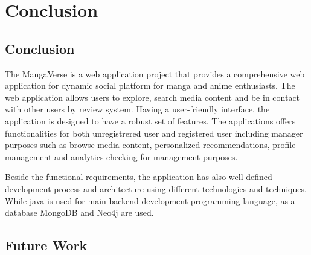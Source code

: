 \chapter{Conclusion}

\section{Conclusion}
The MangaVerse is a web application project that provides a comprehensive web application for 
dynamic social platform for manga and anime enthusiasts. The web application allows users to explore, search media content
and be in contact with other users by review system. Having a user-friendly interface, the application is designed to have a robust set of features.
The applications offers functionalities for both unregistrered user and registered user including manager purposes such as browse 
media content, personalized recommendations, profile management and analytics checking for management purposes.

Beside the functional requirements, the application has also well-defined development process and architecture using 
different technologies and techniques. While java is used for main backend development programming language, as a database MongoDB and
Neo4j are used. 


\section{Future Work}

